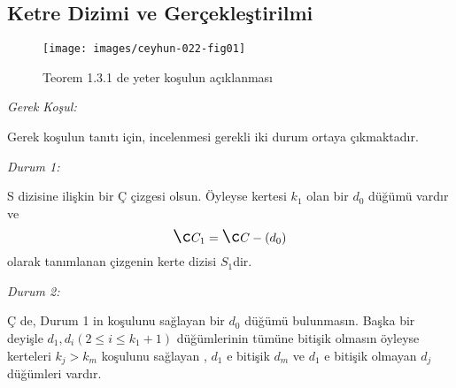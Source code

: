 \documentclass[11pt]{amsbook}
\begin{document}
\subsection {Ketre Dizimi ve Gerçekleştirilmi}
\begin{figure}[htb]
	\centering
	\texttt{[image: images/ceyhun-022-fig01]}
	\caption{Teorem 1.3.1 de yeter koşulun
açıklanması}
	\label{fig:ceyhuncovers}
\end{figure}
\label{Gerek Kosul}
     \textit{Gerek Koşul:}
    
    Gerek koşulun tanıtı için, incelenmesi gerekli iki
    durum ortaya çıkmaktadır. 
    
\label{durum 1}
     \textit{Durum 1:}
    
    S dizisine ilişkin bir {\Large Ç} çizgesi olsun. Öyleyse
    kertesi $k_1$ olan bir $d_0$ düğümü vardır ve $$ {\Large Ç_1} ={\Large Ç}- \left( d_0 \right ) $$ olarak tanımlanan çizgenin kerte dizisi $S_1 $dir.
    
\label{durum 2}
     \textit{Durum 2:}
    
    {\Large Ç} de, Durum 1 in koşulunu sağlayan bir $d_0$ düğümü bulunmasın. Başka bir deyişle $d_1,d_i \left ( 2 \leq i \leq k_1 +1 \right ) $ düğümlerinin tümüne bitişik olmasın öyleyse kerteleri $k_j > k_m $ koşulunu sağlayan , $d_1$ e bitişik $d_m$  ve $d_1 $ e bitişik olmayan $d_j$ düğümleri vardır.
\end{document}
